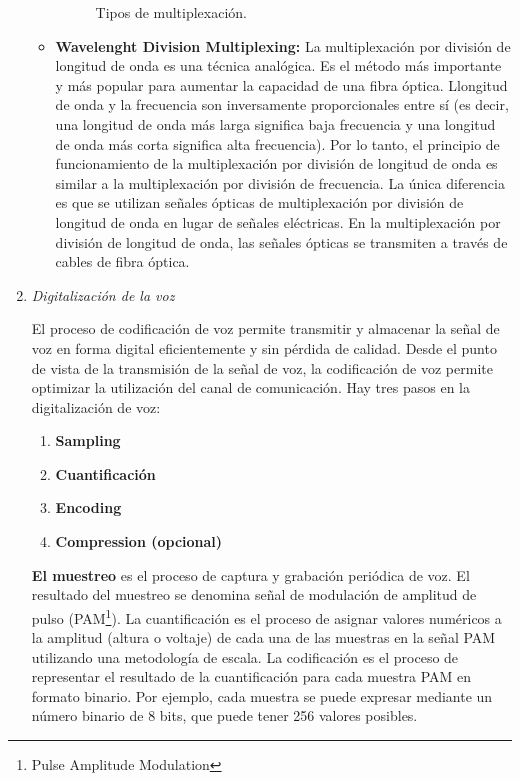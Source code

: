\begin{enumerate}
\begin{itemize}
\begin{figure}[ht!]
\caption{Tipos de multiplexación.}
\end{figure}
\pagebreak
\item \textbf{Wavelenght Division Multiplexing:} La multiplexación por división de longitud de onda es una técnica analógica. Es el método más importante y más popular para aumentar la capacidad de una fibra óptica. Llongitud de onda y la frecuencia son inversamente proporcionales entre sí (es decir, una longitud de onda más larga significa baja frecuencia y una longitud de onda más corta significa alta frecuencia). Por lo tanto, el principio de funcionamiento de la multiplexación por división de longitud de onda es similar a la multiplexación por división de frecuencia. La única diferencia es que se utilizan señales ópticas de multiplexación por división de longitud de onda en lugar de señales eléctricas. En la multiplexación por división de longitud de onda, las señales ópticas se transmiten a través de cables de fibra óptica.
\end{itemize}
\item {\color{red}\textit{Digitalización de la voz}}

El proceso de codificación de voz permite transmitir y almacenar la señal de voz en forma digital eficientemente y sin pérdida de calidad. Desde el punto de vista de la transmisión de la señal de voz, la codificación de voz permite optimizar la utilización del canal de comunicación. Hay tres pasos en la digitalización de voz: 
\begin{enumerate}
\item \textbf{Sampling}

\item \textbf{Cuantificación}

\item  \textbf{Encoding}

\item \textbf{Compression (opcional)}
\end{enumerate}
\textbf{El muestreo} es el proceso de captura y grabación periódica de voz. El resultado del muestreo se denomina señal de modulación de amplitud de pulso (PAM\footnote{Pulse Amplitude Modulation}). La cuantificación es el proceso de asignar valores numéricos a la amplitud (altura o voltaje) de cada una de las muestras en la señal PAM utilizando una metodología de escala. La codificación es el proceso de representar el resultado de la cuantificación para cada muestra PAM en formato binario. Por ejemplo, cada muestra se puede expresar mediante un número binario de 8 bits, que puede tener 256 valores posibles. \\


\end{enumerate}
